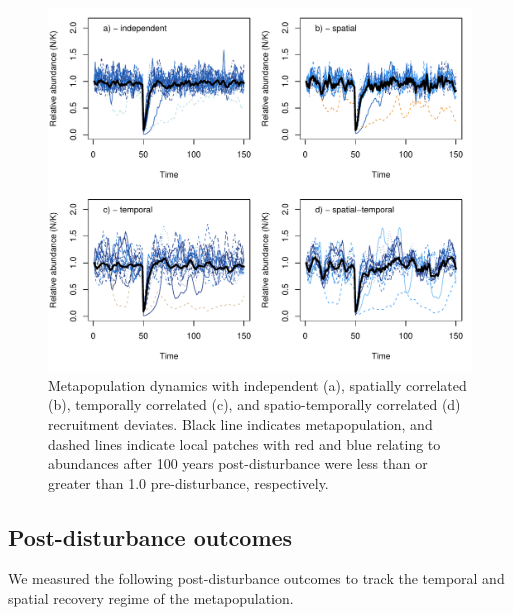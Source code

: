 \documentclass[
]{article}
\begin{document}
\begin{figure}[H]

{\centering \includegraphics{Managing_for_ecological_surprises_in_metapopulations_files/figure-latex/independent stochasticity-1} 

}

\caption{Metapopulation dynamics with independent (a), spatially correlated (b), temporally correlated (c), and spatio-temporally correlated (d) recruitment deviates. Black line indicates metapopulation, and dashed lines indicate local patches with red and blue relating to abundances after 100 years post-disturbance were less than or greater than 1.0 pre-disturbance, respectively.}\label{fig:independent stochasticity}
\end{figure}

\hypertarget{post-disturbance-outcomes}{%
\subsection{Post-disturbance outcomes}\label{post-disturbance-outcomes}}

We measured the following post-disturbance outcomes to track the
temporal and spatial recovery regime of the metapopulation.
\end{document}

